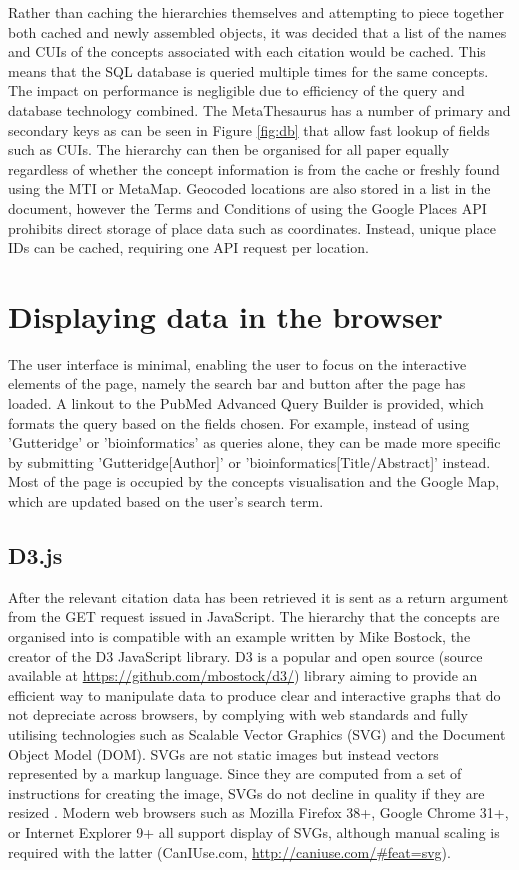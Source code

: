 \documentclass[Report.tex]{subfiles}
\begin{document}
\noindent Rather than caching the hierarchies themselves and attempting to piece together both cached and newly assembled objects, it was decided that a list of the names and CUIs of the concepts associated with each citation would be cached. This means that the SQL database is queried multiple times for the same concepts. The impact on performance is negligible due to efficiency of the query and database technology combined. The MetaThesaurus has a number of primary and secondary keys as can be seen in Figure \ref{fig:db} that allow fast lookup of fields such as CUIs. The hierarchy can then be organised for all paper equally regardless of whether the concept information is from the cache or freshly found using the MTI or MetaMap. Geocoded locations are also stored in a list in the document, however the Terms and Conditions of using the Google Places API prohibits direct storage of place data such as coordinates. Instead, unique place IDs can be cached, requiring one API request per location.   

\section{Displaying data in the browser}
The user interface is minimal, enabling the user to focus on the interactive elements of the page, namely the search bar and button after the page has loaded. A linkout to the PubMed Advanced Query Builder is provided, which formats the query based on the fields chosen. For example, instead of using 'Gutteridge' or 'bioinformatics' as queries alone, they can be made more specific by submitting 'Gutteridge[Author]' or 'bioinformatics[Title/Abstract]' instead. Most of the page is occupied by the concepts visualisation and the Google Map, which are updated based on the user's search term.
 
\subsection{D3.js}
After the relevant citation data has been retrieved it is sent as a return argument from the GET request issued in JavaScript. The hierarchy that the concepts are organised into is compatible with an example written by Mike Bostock, the creator of the D3 JavaScript library. D3 is a popular and open source (source available at \url{https://github.com/mbostock/d3/}) library aiming to provide an efficient way to manipulate data to produce clear and interactive graphs that do not depreciate across browsers, by complying with web standards and fully utilising technologies such as Scalable Vector Graphics (SVG) and the Document Object Model (DOM). SVGs are not static images but instead vectors represented by a markup language. Since they are computed from a set of instructions for creating the image, SVGs do not decline in quality if they are resized \cite{svgfaq}. Modern web browsers such as Mozilla Firefox 38+, Google Chrome 31+, or Internet Explorer 9+ all support display of SVGs, although manual scaling is required with the latter (CanIUse.com, \url{http://caniuse.com/#feat=svg}).\newline
\end{document}
